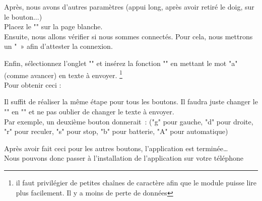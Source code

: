 Après, nous avons d'autres  paramètres (appui long, après avoir retiré le doig, sur le bouton...) \\


Placez le "" sur la page blanche. \\

Ensuite, nous allons vérifier si nous sommes connectés. Pour cela, nous mettrons un " » afin d’attester la connexion.

Enfin, sélectionnez l'onglet "" et insérez la fonction "" en mettant le mot "a" (comme avancer) en texte à envoyer. \footnote{il faut privilégier de petites chaînes de caractère afin que le module puisse lire plus facilement. Il y a moins de perte de données} \\
Pour obtenir ceci : 



Il suffit de réaliser la même étape pour tous les boutons. Il faudra juste changer le "" en "" et ne pas oublier de changer le texte à envoyer. \\


Par exemple, un deuxième bouton donnerait :  ("g" pour gauche, "d" pour droite, "r" pour reculer, "s" pour stop, "b" pour batterie, "A" pour automatique)


Après avoir fait ceci pour les autres boutons, l'application est terminée… \\
Nous pouvons donc passer à l'installation de l'application sur votre téléphone